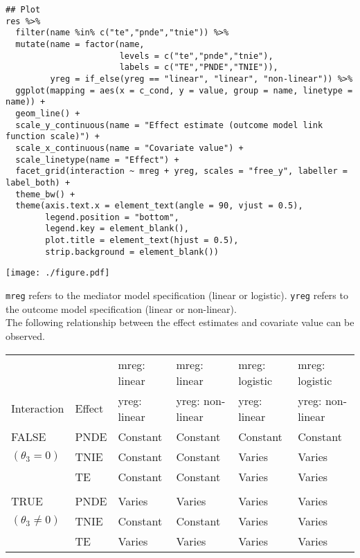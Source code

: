 \documentclass[dvipdfmx,10pt]{article}
\begin{document}
\begin{verbatim}
## Plot
res %>%
  filter(name %in% c("te","pnde","tnie")) %>%
  mutate(name = factor(name,
                       levels = c("te","pnde","tnie"),
                       labels = c("TE","PNDE","TNIE")),
         yreg = if_else(yreg == "linear", "linear", "non-linear")) %>%
  ggplot(mapping = aes(x = c_cond, y = value, group = name, linetype = name)) +
  geom_line() +
  scale_y_continuous(name = "Effect estimate (outcome model link function scale)") +
  scale_x_continuous(name = "Covariate value") +
  scale_linetype(name = "Effect") +
  facet_grid(interaction ~ mreg + yreg, scales = "free_y", labeller = label_both) +
  theme_bw() +
  theme(axis.text.x = element_text(angle = 90, vjust = 0.5),
        legend.position = "bottom",
        legend.key = element_blank(),
        plot.title = element_text(hjust = 0.5),
        strip.background = element_blank())
\end{verbatim}

\begin{center}
\texttt{[image: ./figure.pdf]}
\end{center}

\normalsize

\texttt{mreg} refers to the mediator model specification (linear or logistic). \texttt{yreg} refers to the outcome model specification (linear or non-linear).\\

The following relationship between the effect estimates and covariate value can be observed.

\begin{center}
\begin{tabular}{llllll}
 &  & mreg: linear & mreg: linear & mreg: logistic & mreg: logistic\\
Interaction & Effect & yreg: linear & yreg: non-linear & yreg: linear & yreg: non-linear\\
\hline
FALSE & PNDE & Constant & Constant & Constant & Constant\\
\((\theta_{3} = 0)\) & TNIE & Constant & Constant & Varies & Varies\\
 & TE & Constant & Constant & Varies & Varies\\
 &  &  &  &  & \\
TRUE & PNDE & Varies & Varies & Varies & Varies\\
\((\theta_{3} \ne 0)\) & TNIE & Constant & Constant & Varies & Varies\\
 & TE & Varies & Varies & Varies & Varies\\
\end{tabular}
\end{center}
\end{document}

